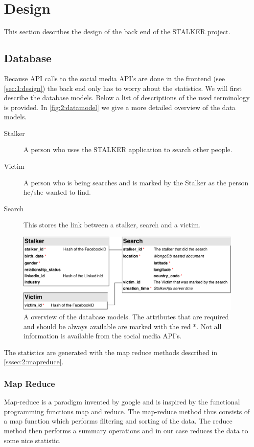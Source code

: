 \section{Design}

This section describes the design of the back end of the STALKER project. 

\subsection{Database}
Because API calls to the social media API's are done in the frontend (see \autoref{sec:1:design}) the back end only has to worry about the statistics. We will first describe the database models. Below a list of descriptions of the used terminology is provided. In \autoref{fig:2:datamodel} we give a more detailed overview of the data models.

\begin{description}
\item[Stalker] A person who uses the STALKER application to search other people.
\item[Victim] A person who is being searches and is marked by the Stalker as the person he/she wanted to find.
\item[Search] This stores the link between a stalker, search and a victim.
\end{description}

\begin{figure}
\includegraphics[width=\textwidth]{./img/database_models}   
\caption{A overview of the database models. The attributes that are required and should be always available are marked with the red *. Not all information is available from the social media API's.}
\label{fig:2:datamodel}
\end{figure}

The statistics are generated with the map reduce methods described in \autoref{sssec:2:mapreduce}.

\subsubsection{Map Reduce}
\label{sssec:2:mapreduce}
Map-reduce is a paradigm invented by google and is inspired by the functional programming functions map and reduce. The map-reduce method thus consists of a map function which performs filtering and sorting of the data. The reduce method then performs a summary operations and in our case reduces the data to some nice statistic. 

